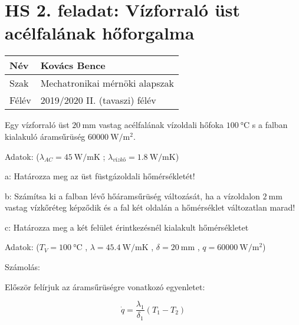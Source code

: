 
\section*{HS 2. feladat: Vízforraló üst acélfalának hőforgalma}

\begin{tabular}{ | p{2cm} | p{14cm} | } 
	\hline
	Név & Kovács Bence \\ 
	\hline
	Szak &  Mechatronikai mérnöki alapszak\\
	\hline
	Félév & 2019/2020 II. (tavaszi) félév \\ 
	\hline
\end{tabular}
\vspace{0.5cm}


Egy vízforraló üst $\SI{20}{\milli\meter}$ vastag acélfalának vízoldali hőfoka $\SI{100}{\celsius}$ s a falban kialakuló áramsűrüség $\SI{60000}{\watt\per\meter^2}$.

\noindent Adatok:    ($\lambda_{AC} = \SI{45}{\watt\per\meter\kelvin}$ ;
                     $\lambda_{\textit{vízkő}} = \SI{1,8}{\watt\per\meter\kelvin}$)
                     
\vspace{1mm}

\vspace{1mm}
\noindent a: Határozza meg az üst füstgázoldali hőmérsékletét!

\vspace{1mm}
\noindent b: Számítsa ki a falban lévő hőáramsűrüség változását, ha a vízoldalon $\SI{2}{\milli\meter}$ vastag vízkőréteg képződik és a fal két oldalán a hőmérséklet változatlan marad!

\vspace{1mm}
\noindent c: Határozza meg a két felület érintkezésnél kialakult hőmérsékletet
\vspace{1mm}

Adatok:
($ T_V = \SI{100}{\celsius} $ , $\lambda = \SI{45.4}{\watt\per\meter\kelvin}$ , $\delta = \SI{20}{\milli\meter}$ ,  $ q = \SI{60000}{\watt\per\meter^2} $)

\vspace{2mm}

Számolás:


Először felírjuk az áramsűrüségre vonatkozó egyenletet:

\begin{equation}
	 \dot{q} = \frac{\lambda_1}{\delta_1} (T_1 - T_2)
\end{equation}


